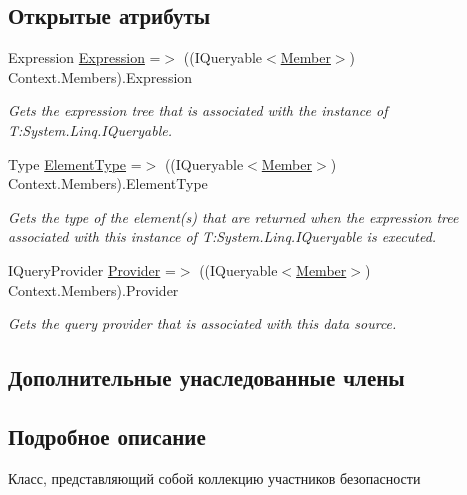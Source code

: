 \subsection*{Открытые атрибуты}
\begin{DoxyCompactItemize}
\item 
Expression \hyperlink{class_security_1_1_entity_framework_1_1_collections_1_1_member_collection_a9abd92eeb0b2c3c20c6d20022bf67756}{Expression} =$>$ ((I\+Queryable$<$\hyperlink{class_security_1_1_model_1_1_member}{Member}$>$) Context.\+Members).Expression
\begin{DoxyCompactList}\small\item\em Gets the expression tree that is associated with the instance of T\+:\+System.\+Linq.\+I\+Queryable. \end{DoxyCompactList}\item 
Type \hyperlink{class_security_1_1_entity_framework_1_1_collections_1_1_member_collection_aecc1eacf6910c5ffa7d8f3401f8cc814}{Element\+Type} =$>$ ((I\+Queryable$<$\hyperlink{class_security_1_1_model_1_1_member}{Member}$>$) Context.\+Members).Element\+Type
\begin{DoxyCompactList}\small\item\em Gets the type of the element(s) that are returned when the expression tree associated with this instance of T\+:\+System.\+Linq.\+I\+Queryable is executed. \end{DoxyCompactList}\item 
I\+Query\+Provider \hyperlink{class_security_1_1_entity_framework_1_1_collections_1_1_member_collection_ad6b2df9f7a78c07be30abd81acf88f77}{Provider} =$>$ ((I\+Queryable$<$\hyperlink{class_security_1_1_model_1_1_member}{Member}$>$) Context.\+Members).Provider
\begin{DoxyCompactList}\small\item\em Gets the query provider that is associated with this data source. \end{DoxyCompactList}\end{DoxyCompactItemize}
\subsection*{Дополнительные унаследованные члены}


\subsection{Подробное описание}
Класс, представляющий собой коллекцию участников безопасности 



